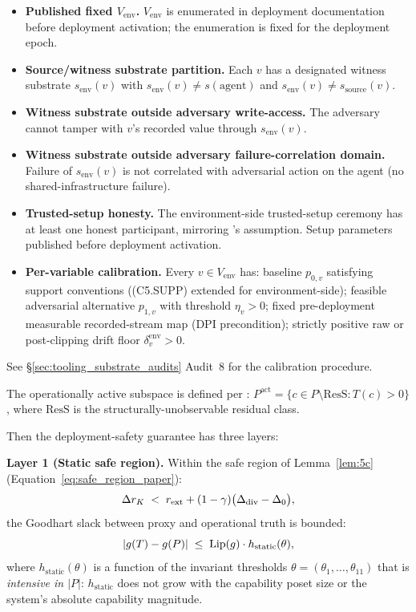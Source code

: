 \begin{theorem}
\begin{enumerate}
\begin{itemize}
  \item[\textbf{(C12.PUB)}] \textbf{Published fixed
    $V_{\mathrm{env}}$.}  $V_{\mathrm{env}}$ is enumerated in
    deployment documentation before deployment activation; the
    enumeration is fixed for the deployment epoch.
  \item[\textbf{(C12.PART)}] \textbf{Source/witness substrate
    partition.}  Each $v$ has a designated witness substrate
    $s_{\mathrm{env}}(v)$ with $s_{\mathrm{env}}(v) \neq
    s(\mathrm{agent})$ and $s_{\mathrm{env}}(v) \neq
    s_{\mathrm{source}}(v)$.
  \item[\textbf{(C12.TRUST-WRITE)}] \textbf{Witness substrate
    outside adversary write-access.}  The adversary cannot tamper
    with $v$'s recorded value through $s_{\mathrm{env}}(v)$.
  \item[\textbf{(C12.TRUST-CORR)}] \textbf{Witness substrate
    outside adversary failure-correlation domain.}  Failure of
    $s_{\mathrm{env}}(v)$ is not correlated with adversarial
    action on the agent (no shared-infrastructure failure).
  \item[\textbf{(C12.SETUP)}] \textbf{Trusted-setup honesty.}  The
    environment-side trusted-setup ceremony has at least one
    honest participant, mirroring \citep[Exogenous~Verification]
    {lasser2026exo}'s assumption.  Setup parameters published
    before deployment activation.
  \item[\textbf{(C12.CAL)}] \textbf{Per-variable calibration.}
    Every $v \in V_{\mathrm{env}}$ has: baseline $p_{0, v}$
    satisfying support conventions ((C5.SUPP) extended for
    environment-side); feasible adversarial alternative $p_{1, v}$
    with threshold $\eta_v > 0$; fixed pre-deployment measurable
    recorded-stream map (DPI precondition); strictly positive raw
    or post-clipping drift floor $\delta_v^{\mathrm{env}} > 0$.
  \end{itemize}
  See \S\ref{sec:tooling_substrate_audits} Audit~8 for the
  calibration procedure.
\end{enumerate}

\noindent The operationally active subspace is defined per
\citep[Microfoundation]{lasser2026micro}: $P^{\mathrm{act}} = \{c
\in P \setminus \mathrm{ResS} : T(c) > 0\}$, where $\mathrm{ResS}$
is the structurally-unobservable residual class.

Then the deployment-safety guarantee has three layers:

\medskip\noindent\textbf{Layer 1 (Static safe region).}
Within the safe region of Lemma~\ref{lem:5c}
(Equation~\ref{eq:safe_region_paper}):
\[
  \Delta r_K \;<\; r_{\mathrm{ext}} + (1 - \gamma)\bigl(\Delta_{\mathrm{div}} - \Delta_0\bigr),
\]
the Goodhart slack between proxy and operational truth is bounded:
\[
  |g(T) - g(P)| \;\leq\; \mathrm{Lip}(g) \cdot
  h_{\mathrm{static}}(\theta),
\]
where $h_{\mathrm{static}}(\theta)$ is a function of the invariant
thresholds $\theta = (\theta_1, \ldots, \theta_{11})$ that is
\emph{intensive in $|P|$}: $h_{\mathrm{static}}$ does not grow with
the capability poset size or the system's absolute capability
magnitude.


\end{theorem}
